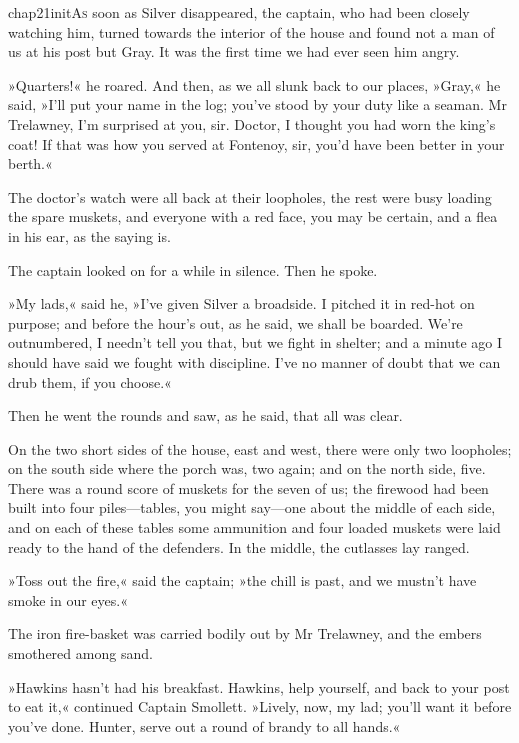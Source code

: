 
   \lettrine[lines=4,image=true]{chap21initA}{s} soon as Silver disappeared, the captain, who had been closely watching him, turned towards the interior of the house and found not a man of us at his post but Gray. It was the first time we had ever seen him angry.

»Quarters!« he roared. And then, as we all slunk back to our places, »Gray,« he said, »I'll put your name in the log; you've stood by your duty like a seaman. Mr Trelawney, I'm surprised at you, sir. Doctor, I thought you had worn the king's coat! If that was how you served at Fontenoy, sir, you'd have been better in your berth.«

The doctor's watch were all back at their loopholes, the rest were busy loading the spare muskets, and everyone with a red face, you may be certain, and a flea in his ear, as the saying is.

The captain looked on for a while in silence. Then he spoke.

»My lads,« said he, »I've given Silver a broadside. I pitched it in red-hot on purpose; and before the hour's out, as he said, we shall be boarded. We're outnumbered, I needn't tell you that, but we fight in shelter; and a minute ago I should have said we fought with discipline. I've no manner of doubt that we can drub them, if you choose.«

Then he went the rounds and saw, as he said, that all was clear.

On the two short sides of the house, east and west, there were only two loopholes; on the south side where the porch was, two again; and on the north side, five. There was a round score of muskets for the seven of us; the firewood had been built into four piles—tables, you might say—one about the middle of each side, and on each of these tables some ammunition and four loaded muskets were laid ready to the hand of the defenders. In the middle, the cutlasses lay ranged.

»Toss out the fire,« said the captain; »the chill is past, and we mustn't have smoke in our eyes.«

The iron fire-basket was carried bodily out by Mr Trelawney, and the embers smothered among sand.

»Hawkins hasn't had his breakfast. Hawkins, help yourself, and back to your post to eat it,« continued Captain Smollett. »Lively, now, my lad; you'll want it before you've done. Hunter, serve out a round of brandy to all hands.«

